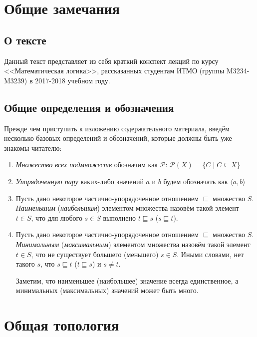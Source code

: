 \section{Общие замечания}

\subsection{О тексте}

Данный текст представляет из себя краткий конспект лекций по курсу
<<Математическая логика>>, рассказанных студентам ИТМО (группы M3234-M3239)
в 2017-2018 учебном году.

\subsection{Общие определения и обозначения}

Прежде чем приступить к изложению содержательного материала, введём несколько
базовых определений и обозначений, которые должны быть уже знакомы читателю:

\begin{enumerate}
\item \emph{Множество всех подмножеств} обозначим как $\mathcal{P}$:
$\mathcal{P}(X) = \{ C \mid C \subseteq X \}$

\item \emph{Упорядоченную пару} каких-либо значений $a$ и $b$ 
будем обозначать как $\langle a, b \rangle$

\item Пусть дано некоторое частично-упорядоченное отношением $\sqsubseteq$ множество $S$.
\emph{Наименьшим} (\emph{наибольшим}) элементом множества назовём такой элемент $t \in S$, 
что для любого $s \in S$ выполнено $t \sqsubseteq s$ ($s \sqsubseteq t$).

\item Пусть дано некоторое частично-упорядоченное отношением $\sqsubseteq$ множество $S$.
\emph{Минимальным} (\emph{максимальным}) элементом множества назовём такой элемент $t \in S$, 
что не существует большего (меньшего) $s \in S$. Иными словами, нет такого $s$, что
$s \sqsubseteq t$ ($t \sqsubseteq s$) и $s \ne t$.

Заметим, что наименьшее (наибольшее) значение всегда единственное, а минимальных
(максимальных) значений может быть много.

\end{enumerate}

\section{Общая топология}

